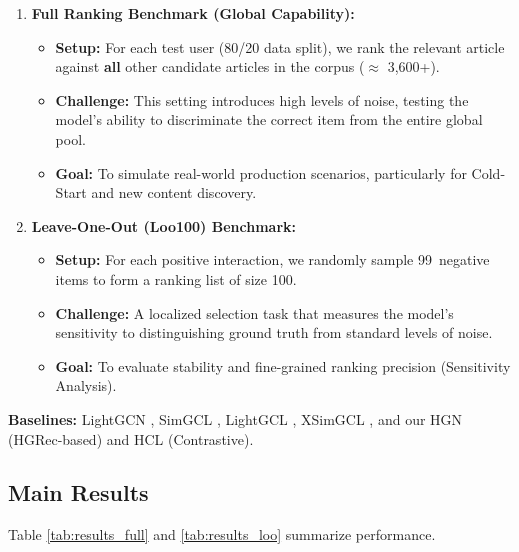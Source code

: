 \documentclass[11pt]{article}
\begin{document}
\begin{enumerate}
  \item \textbf{Full Ranking Benchmark (Global Capability):}
        \begin{itemize}
          \item \textbf{Setup:} For each test user (80/20 data split), we rank the relevant article against \textbf{all} other candidate articles in the corpus ($\approx$ 3,600+).
          \item \textbf{Challenge:} This setting introduces high levels of noise, testing the model's ability to discriminate the correct item from the entire global pool.
          \item \textbf{Goal:} To simulate real-world production scenarios, particularly for Cold-Start and new content discovery.
        \end{itemize}

  \item \textbf{Leave-One-Out (Loo100) Benchmark:}
        \begin{itemize}
          \item \textbf{Setup:} For each positive interaction, we randomly sample 99\ negative items to form a ranking list of size 100.
          \item \textbf{Challenge:} A localized selection task that measures the model's sensitivity to distinguishing ground truth from standard levels of noise.
          \item \textbf{Goal:} To evaluate stability and fine-grained ranking precision (Sensitivity Analysis).
        \end{itemize}
\end{enumerate}

\textbf{Baselines:} LightGCN \cite{he2020lightgcn}, SimGCL \cite{yu2022graph}, LightGCL \cite{cai2023lightgcl}, XSimGCL \cite{yu2023xsimgcl}, and our HGN (HGRec-based) and HCL (Contrastive).

\subsection{Main Results}
Table \ref{tab:results_full} and \ref{tab:results_loo} summarize performance.
\end{document}
